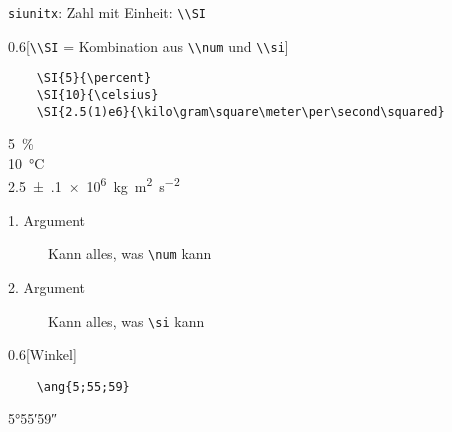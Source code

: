 \begin{frame}[fragile]{\texttt{siunitx}: Zahl mit Einheit: \lstinline+\\SI+}
  \begin{CodeExample}{0.6}[\lstinline+\\SI+ {=} Kombination aus \lstinline+\\num+ und \lstinline+\\si+]
    \begin{lstlisting}
    \SI{5}{\percent}
    \SI{10}{\celsius}
    \SI{2.5(1)e6}{\kilo\gram\square\meter\per\second\squared}
    \end{lstlisting}
  \CodeResult
    \SI{5}{\percent}\\
    \SI{10}{\celsius}\\
    \SI{2.5(1)e6}{\kilo\gram\square\meter\per\second\squared}
  \end{CodeExample}
  \begin{description}
    \item[1. Argument] Kann alles, was \lstinline+\num+ kann
    \item[2. Argument] Kann alles, was \lstinline+\si+ kann
  \end{description}
  \begin{CodeExample}{0.6}[Winkel]
    \begin{lstlisting}
    \ang{5;55;59}
    \end{lstlisting}
  \CodeResult
    \ang{5;55;59}
  \end{CodeExample}
  
\end{frame}
